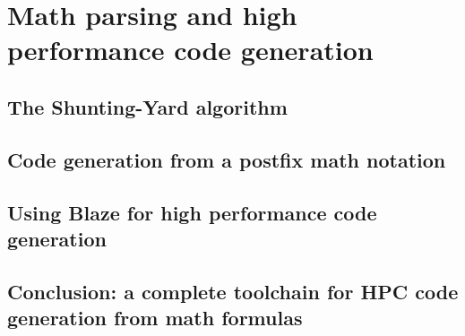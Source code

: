 \documentclass[../main]{subfiles}
\begin{document}
\section{
  Math parsing and high performance code generation
}

\subsection{
  The Shunting-Yard algorithm
}

\subsection{
  Code generation from a postfix math notation
}

\subsection{
  Using Blaze for high performance code generation
}

\subsection{
  Conclusion: a complete toolchain for HPC code generation from math formulas
}
\end{document}
